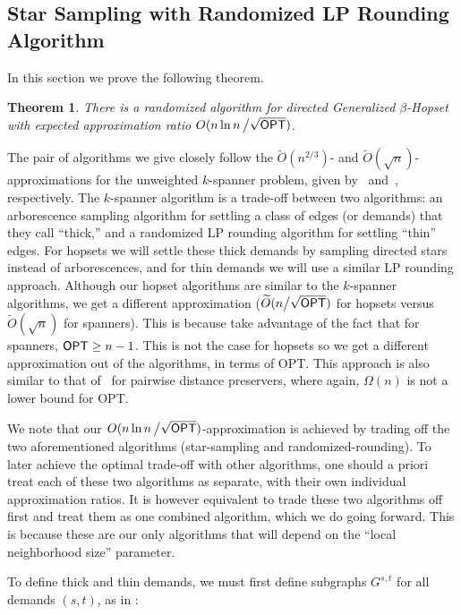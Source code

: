 \documentclass{article}
\newtheorem{theorem}{Theorem}[section]
\theoremstyle{definition}
\theoremstyle{remark}
\def\opt {{\sf OPT}}
\def\hopset {{\sc Generalized $\beta$-Hopset}}
\begin{document}
 
\subsection{Star Sampling with Randomized LP Rounding Algorithm} \label{sec:star_sampling_rounding}


In this section we prove the following theorem.

\begin{theorem} \label{thm:bbmry_alg}
    There is a randomized algorithm for directed {\hopset} with expected approximation ratio $O( n \ln{n} \, \big/ \sqrt{\opt})$.
\end{theorem}

The pair of algorithms we give closely follow the $\widetilde{O}(n^{2/3})$- and $\widetilde{O}(\sqrt{n})$-approximations for the unweighted $k$-spanner problem, given by~\cite{DK11} and~\cite{BBMRY11}, respectively. The $k$-spanner algorithm is a trade-off between two algorithms: an arborescence sampling algorithm for settling a class of edges (or demands) that they call ``thick,'' and a randomized LP rounding algorithm for settling ``thin'' edges. For hopsets we will settle these thick demands by sampling directed stars instead of arborescences, and for thin demands we will use a similar LP rounding approach. Although our hopset algorithms are similar to the $k$-spanner algorithms, we get a different approximation ($\widetilde{O}( n \big/ \sqrt{\opt})$ for hopsets versus $\widetilde{O}(\sqrt{n})$ for spanners). This is because \cite{DK11, BBMRY11} take advantage of the fact that for spanners, ${\opt} \geq n-1$. This is not the case for hopsets so we get a different approximation out of the algorithms, in terms of {\opt}. This approach is also similar to that of~\cite{CDKL20} for pairwise distance preservers, where again, $\Omega(n)$ is not a lower bound for {\opt}.

We note that our $O( n \ln{n} \, \big/ \sqrt{\opt})$-approximation is achieved by trading off the two aforementioned algorithms (star-sampling and randomized-rounding). To later achieve the optimal trade-off with other algorithms, one should a priori treat each of these two algorithms as separate, with their own individual approximation ratios. It is however equivalent to trade these two algorithms off first and treat them as one combined algorithm, which we do going forward. This is because these are our only algorithms that will depend on the ``local neighborhood size'' parameter.

To define thick and thin demands, we must first define subgraphs $G^{s,t}$ for all demands $(s,t)$, as in \cite{DK11, BBMRY11}:
\end{document}
